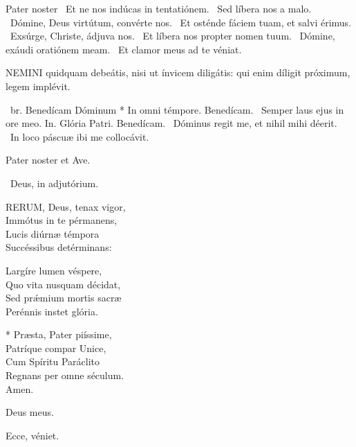 Pater noster  \V\ Et ne nos indúcas in tentatiónem. \R\ Sed líbera nos a malo. \V\ Dómine, Deus virtútum, convérte nos. \R\ Et osténde fáciem tuam, et salvi érimus. \V\ Exsúrge, Christe, ádjuva nos. \R\ Et líbera nos propter nomen tuum. \V\ Dómine, exáudi oratiónem meam. \R\ Et clamor meus ad te véniat.




\lettrine[lines=2]{N}{EMINI} quidquam debeátis, nisi ut ínvicem diligátis: qui enim díligit próximum, legem implévit.

\R\ br. Benedícam Dóminum * In omni témpore. Benedícam. \V\ Semper laus ejus in ore meo. In. Glória Patri. Benedícam. \V\ Dóminus regit me, et nihil mihi déerit. \R\ In loco páscuæ ibi me collocávit.



\sectionornament


Pater noster et Ave.

\V\ Deus, in adjutórium.


\lettrine[lines=2]{R}{ERUM}, Deus, tenax vigor,\\
Immótus in te pérmanens,\\
Lucis diúrnæ témpora\\
Succéssibus detérminans:

Largíre lumen véspere,\\
Quo vita nusquam décidat,\\
Sed prǽmium mortis sacræ\\
Perénnis instet glória.

* Præsta, Pater piíssime,\\
Patríque compar Unice,\\
Cum Spíritu Paráclito\\
Regnans per omne séculum.\\
Amen.

  Deus meus.


  Ecce, véniet.

